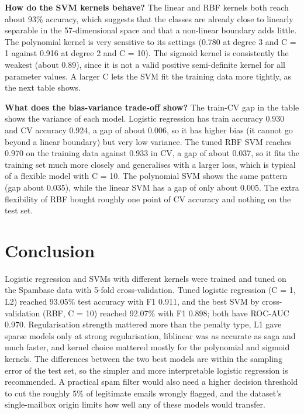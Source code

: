 \documentclass[11pt]{article}
\begin{document}
\textbf{How do the SVM kernels behave?} The linear and RBF kernels both reach about 93\% accuracy, which suggests that the classes are already close to linearly separable in the 57-dimensional space and that a non-linear boundary adds little. The polynomial kernel is very sensitive to its settings (0.780 at degree 3 and C = 1 against 0.916 at degree 2 and C = 10). The sigmoid kernel is consistently the weakest (about 0.89), since it is not a valid positive semi-definite kernel for all parameter values. A larger C lets the SVM fit the training data more tightly, as the next table shows.

\textbf{What does the bias-variance trade-off show?} The train-CV gap in the table shows the variance of each model. Logistic regression has train accuracy 0.930 and CV accuracy 0.924, a gap of about 0.006, so it has higher bias (it cannot go beyond a linear boundary) but very low variance. The tuned RBF SVM reaches 0.970 on the training data against 0.933 in CV, a gap of about 0.037, so it fits the training set much more closely and generalises with a larger loss, which is typical of a flexible model with C = 10. The polynomial SVM shows the same pattern (gap about 0.035), while the linear SVM has a gap of only about 0.005. The extra flexibility of RBF bought roughly one point of CV accuracy and nothing on the test set.

\section*{Conclusion}
\label{sec:org2ea2a87}


Logistic regression and SVMs with different kernels were trained and tuned on the Spambase
data with 5-fold cross-validation. Tuned logistic regression (C = 1, L2) reached 93.05\% test
accuracy with F1 0.911, and the best SVM by cross-validation (RBF, C = 10) reached 92.07\%
with F1 0.898; both have ROC-AUC 0.970. Regularisation strength mattered more than the
penalty type, L1 gave sparse models only at strong regularisation, liblinear was as accurate
as saga and much faster, and kernel choice mattered mostly for the polynomial and sigmoid
kernels. The differences between the two best models are within the sampling error of the
test set, so the simpler and more interpretable logistic regression is recommended. A
practical spam filter would also need a higher decision threshold to cut the roughly 5\% of
legitimate emails wrongly flagged, and the dataset's single-mailbox origin limits how well
any of these models would transfer.
\end{document}
